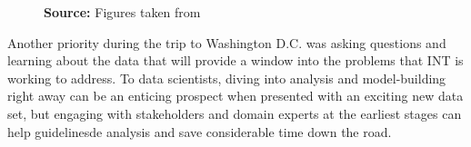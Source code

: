 \begin{figure}[H]
\begin{subfigure}[t]{0.5\textwidth}
\end{subfigure}
\footnotesize{\textbf{Source:} Figures taken from \cite{wb_poster}}
\end{figure}

Another priority during the trip to Washington D.C. was asking questions and learning about the data that will provide a window into the problems that INT is working to address. To data scientists, diving into analysis and model-building right away can be an enticing prospect when presented with an exciting new data set, but engaging with stakeholders and domain experts at the earliest stages can help guidelinesde analysis and save considerable time down the road.






